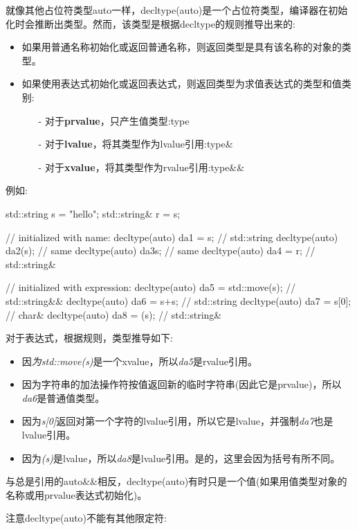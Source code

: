 就像其他占位符类型auto一样，decltype(auto)是一个占位符类型，编译器在初始化时会推断出类型。然而，该类型是根据decltype的规则推导出来的:

\begin{itemize}
	\item 如果用普通名称初始化或返回普通名称，则返回类型是具有该名称的对象的类型。
	\item 如果使用表达式初始化或返回表达式，则返回类型为求值表达式的类型和值类别:
	\begin{itemize}
		\item[-] 对于\textbf{prvalue}，只产生值类型:type
		\item[-] 对于\textbf{lvalue}，将其类型作为lvalue引用:type\&
		\item[-] 对于\textbf{xvalue}，将其类型作为rvalue引用:type\&\&
	\end{itemize}
\end{itemize}

例如:

\begin{cppcode}
std::string s = "hello";
std::string& r = s;

// initialized with name:
decltype(auto) da1 = s; // std::string
decltype(auto) da2(s); // same
decltype(auto) da3{s}; // same
decltype(auto) da4 = r; // std::string&

// initialized with expression:
decltype(auto) da5 = std::move(s); // std::string&&
decltype(auto) da6 = s+s; // std::string
decltype(auto) da7 = s[0]; // char&
decltype(auto) da8 = (s); // std::string&
\end{cppcode}

对于表达式，根据规则，类型推导如下:

\begin{itemize}
	\item 因\textit{为std::move(s)}是一个xvalue，所以\textit{da5}是rvalue引用。
	\item 因为字符串的加法操作符按值返回新的临时字符串(因此它是prvalue)，所以\textit{da6}是普通值类型。
	\item 因为\textit{s[0]}返回对第一个字符的lvalue引用，所以它是lvalue，并强制\textit{da7}也是lvalue引用。
	\item 因为\textit{(s)}是lvalue，所以\textit{da8}是lvalue引用。是的，这里会因为括号有所不同。
\end{itemize}

与总是引用的auto\&\&相反，decltype(auto)有时只是一个值(如果用值类型对象的名称或用prvalue表达式初始化)。

注意decltype(auto)不能有其他限定符:

